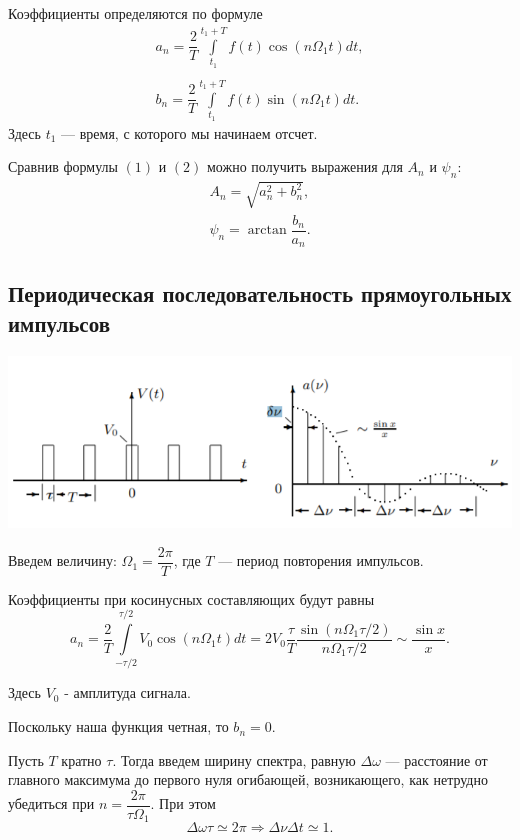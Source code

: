 \documentclass[12pt,a4paper]{article}
\begin{document}
Коэффициенты определяются по формуле
\begin{equation}
\begin{array}{c}
a_n  = \dfrac{2}{T}\int\limits_{t_1}^{t_1+T}f(t)\cos\left(n \Omega_1 t\right) dt,\\
\\
b_n = \dfrac{2}{T}\int\limits_{t_1}^{t_1+T}f(t)\sin\left(n \Omega_1 t\right) dt.
\end{array}
\end{equation}
Здесь $t_1$ --- время, с которого мы начинаем отсчет.

Сравнив формулы $(1)$ и $(2)$ можно получить выражения для $A_n$  и $\psi_n$:
\begin{equation}
\begin{array}{l}
A_n = \sqrt{a_n^2+b_n^2},\\
 \psi_n = \arctan \dfrac{b_n}{a_n}.
\end{array}
\end{equation}

\subsection{Периодическая последовательность прямоугольных импульсов}
\begin{center}
\includegraphics[scale=0.9]{s1.png}
\end{center}
Введем величину: $\Omega_1 = \dfrac{2\pi}{T}$,
где $T$ --- период повторения импульсов.

Коэффициенты при косинусных составляющих будут равны
\begin{equation}
a_n = \dfrac{2}{T}\int\limits_{-\tau/2}^{\tau/2}V_0\cos\left(n\Omega_1 t\right)dt = 2V_0\dfrac{\tau}{T}\dfrac{\sin\left(n\Omega_1\tau/2\right)}{n\Omega_1\tau/2} \sim \dfrac{\sin x}{x}.
\end{equation}

Здесь $V_0$ - амплитуда сигнала.

Поскольку наша функция четная, то $b_n = 0$. 

Пусть $T$ кратно $\tau$. Тогда введем ширину спектра, равную $\Delta \omega$ --- расстояние от главного максимума до первого нуля огибающей, возникающего, как нетрудно убедиться при $n = \dfrac{2\pi}{\tau \Omega_1}$. При 
этом
\begin{equation}
\Delta \omega \tau \simeq 2\pi \Rightarrow \Delta \nu \Delta t \simeq 1.
\end{equation}
\end{document}
